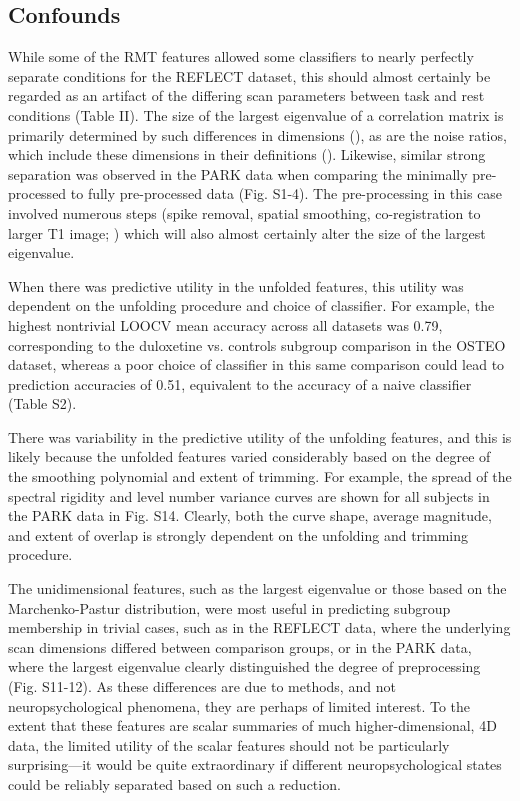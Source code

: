 \subsection{Confounds}
While some of the RMT features allowed some classifiers to nearly perfectly separate conditions for
the REFLECT dataset, this should almost certainly be regarded as an artifact of the differing scan
parameters between task and rest conditions (Table II). The size of the largest eigenvalue of a
correlation matrix is primarily determined by such differences in dimensions
(\cite{yinLimitLargestEigenvalue1988}), as are the noise ratios, which include these dimensions in
their definitions (\cite{veraartDiffusionMRINoise2016,veraartDenoisingDiffusionMRI2016}). Likewise,
similar strong separation was observed in the PARK data when comparing the minimally pre-processed
to fully pre-processed data (Fig. S1-4). The pre-processing in this case involved numerous steps
(spike removal, spatial smoothing, co-registration to larger T1 image;
\cite{madhyasthaDynamicConnectivityRest2015}) which will also almost certainly alter the size of the
largest eigenvalue.

When there was predictive utility in the unfolded features,	 this utility was dependent on the
unfolding procedure and choice of classifier. For example, the highest nontrivial LOOCV mean
accuracy across all datasets was 0.79, corresponding to the duloxetine vs. controls subgroup
comparison in the OSTEO dataset, whereas a poor choice of classifier in this same comparison could
lead to prediction accuracies of 0.51, equivalent to the accuracy of a naive classifier (Table S2).

There was variability in the predictive utility of the unfolding features, and this is likely
because the unfolded features varied considerably based on the degree of the smoothing polynomial
and extent of trimming. For example, the spread of the spectral rigidity and level number variance
curves are shown for all subjects in the PARK data in Fig. S14. Clearly, both the curve shape,
average magnitude, and extent of overlap is strongly dependent on the unfolding and trimming
procedure.

The unidimensional features, such as the largest eigenvalue or those based on the Marchenko-Pastur
distribution, were most useful in predicting subgroup membership in trivial cases, such as in the
REFLECT data, where the underlying scan dimensions differed between comparison groups, or in the
PARK data, where the largest eigenvalue clearly distinguished the degree of preprocessing (Fig.
S11-12). As these differences are due to methods, and not neuropsychological phenomena, they are
perhaps of limited interest. To the extent that these features are scalar summaries of much
higher-dimensional, 4D data, the limited utility of the scalar features should not be particularly
surprising—it would be quite extraordinary if different neuropsychological states could be reliably
separated based on such a reduction.

